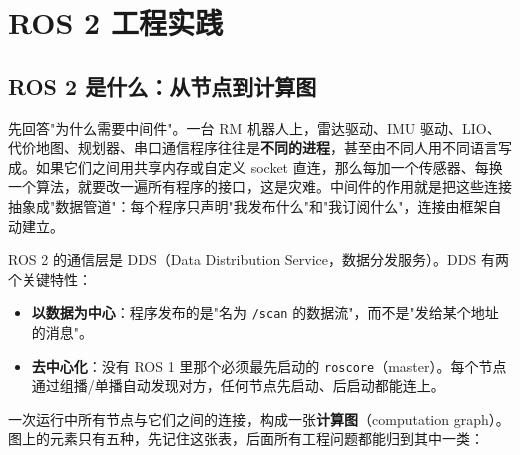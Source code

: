 \chapter{ROS 2 工程实践}\label{ch:25-ros2}
\usetikzlibrary{arrows.meta}


\section{ROS 2 是什么：从节点到计算图}\label{sec:25-what}

先回答"为什么需要中间件"。一台 RM 机器人上，雷达驱动、IMU 驱动、LIO、代价地图、规划器、串口通信程序往往是\textbf{不同的进程}，甚至由不同人用不同语言写成。如果它们之间用共享内存或自定义 socket 直连，那么每加一个传感器、每换一个算法，就要改一遍所有程序的接口，这是灾难。中间件的作用就是把这些连接抽象成"数据管道"：每个程序只声明"我发布什么"和"我订阅什么"，连接由框架自动建立。

ROS 2 的通信层是 DDS（Data Distribution Service，数据分发服务）\cite{macenski2022ros2}。DDS 有两个关键特性：

\begin{itemize}
  \item \textbf{以数据为中心}：程序发布的是"名为 \lstinline{/scan} 的数据流"，而不是"发给某个地址的消息"。
  \item \textbf{去中心化}：没有 ROS 1 里那个必须最先启动的 \lstinline{roscore}（master）。每个节点通过组播/单播自动发现对方，任何节点先启动、后启动都能连上。
\end{itemize}

一次运行中所有节点与它们之间的连接，构成一张\textbf{计算图}（computation graph）。图上的元素只有五种，先记住这张表，后面所有工程问题都能归到其中一类：

